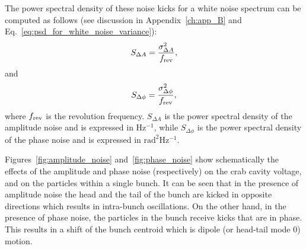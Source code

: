 The power spectral density of these noise kicks for a white noise spectrum can be computed as follows (see discussion in Appendix~\ref{ch:app_B} and Eq.~\eqref{eq:psd_for_white_noise_variance}):
\begin{equation}\label{eq:psd_for_white_noise_variance_AN}
    S_{\Delta A} = \frac{\sigma_{\Delta A}^2 } {{f_\mathrm{rev}}},
 \end{equation}
 and
 \begin{equation}\label{eq:psd_for_white_noise_variance_PN}
    S_{\Delta \phi} = \frac{\sigma_{\Delta \phi}^2 } {{f_\mathrm{rev}}},
 \end{equation}
 where ${f_\mathrm{rev}}$ is the revolution frequency. $S_{\Delta A}$ is the power spectral density of the amplitude noise and is expressed in Hz$^{-1}$, while $S_{\Delta \phi}$ is the power spectral density of the phase noise and is expressed in $\mathrm{rad^2 Hz^{-1}}$.





Figures~\ref{fig:amplitude_noise} and~\ref{fig:phase_noise} show schematically the effects of the amplitude and phase noise (respectively) on the crab cavity voltage, and on the particles within a single bunch. It can be seen that in the presence of amplitude noise the head and the tail of the bunch are kicked in opposite directions which results in intra-bunch oscillations. On the other hand, in the presence of phase noise, the particles in the bunch receive kicks that are in phase. This results in a shift of the bunch centroid which is dipole (or head-tail mode 0) motion.


